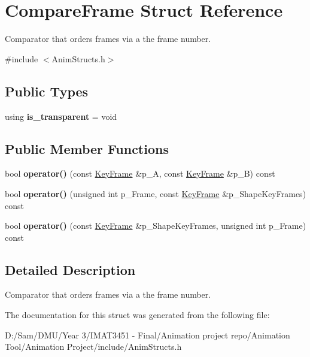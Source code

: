 \hypertarget{struct_compare_frame}{}\section{Compare\+Frame Struct Reference}
\label{struct_compare_frame}


Comparator that orders frames via a the frame number.  




{\ttfamily \#include $<$Anim\+Structs.\+h$>$}

\subsection*{Public Types}
\begin{DoxyCompactItemize}
\item 
\mbox{\label{struct_compare_frame_a9ee39ccc90c3a72c8f91e338e594f5b8}} 
using {\bfseries is\+\_\+transparent} = void
\end{DoxyCompactItemize}
\subsection*{Public Member Functions}
\begin{DoxyCompactItemize}
\item 
\mbox{\label{struct_compare_frame_a4a1d27b71a2080650af0f20dac2b8d68}} 
bool {\bfseries operator()} (const \hyperlink{struct_key_frame}{Key\+Frame} \&p\+\_\+A, const \hyperlink{struct_key_frame}{Key\+Frame} \&p\+\_\+B) const
\item 
\mbox{\label{struct_compare_frame_aad891f00abf4c72b158028b5728f259d}} 
bool {\bfseries operator()} (unsigned int p\+\_\+\+Frame, const \hyperlink{struct_key_frame}{Key\+Frame} \&p\+\_\+\+Shape\+Key\+Frames) const
\item 
\mbox{\label{struct_compare_frame_ae8814c26673640406f5989e92afc6a33}} 
bool {\bfseries operator()} (const \hyperlink{struct_key_frame}{Key\+Frame} \&p\+\_\+\+Shape\+Key\+Frames, unsigned int p\+\_\+\+Frame) const
\end{DoxyCompactItemize}


\subsection{Detailed Description}
Comparator that orders frames via a the frame number. 

The documentation for this struct was generated from the following file\+:\begin{DoxyCompactItemize}
\item 
D\+:/\+Sam/\+D\+M\+U/\+Year 3/\+I\+M\+A\+T3451 -\/ Final/\+Animation project repo/\+Animation Tool/\+Animation Project/include/Anim\+Structs.\+h\end{DoxyCompactItemize}
